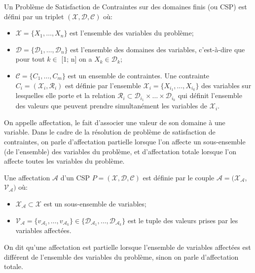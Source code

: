 \begin{definition} Un Problème de Satisfaction de Contraintes sur des domaines finis (ou CSP) est défini par un triplet $(\mathcal{X},\mathcal{D},\mathcal{C})$ où:
	\label{def:CSP}
	\begin{itemize}
		\item $\mathcal{X} = \{X_1, \dots, X_n \}$ est l'ensemble des variables du problème;
		\item $\mathcal{D} = \{\mathcal{D}_1, \dots, \mathcal{D}_n \}$ est l'ensemble des domaines des variables, c'est-à-dire que pour tout $k \in$ [1; n] on a $X_k \in \mathcal{D}_k$;
		\item $\mathcal{C} = \{C_1, \dots, C_m \}$ est un ensemble de contraintes. Une contrainte $C_i=(\mathcal{X}_i, \mathcal{R}_i)$ est définie par l'ensemble $\mathcal{X}_i = \{X_{i_1}, \dots, X_{i_k}\}$ des variables sur lesquelles elle porte et la relation $\mathcal{R}_i \subset \mathcal{D}_{i_1} \times \dots \times \mathcal{D}_{i_k}$ qui définit l'ensemble des valeurs que peuvent prendre simultanément les variables de $\mathcal{X}_i$.
	\end{itemize}
\end{definition}

On appelle affectation, le fait d'associer une valeur de son domaine à une variable. Dans le cadre de la résolution de problème de satisfaction de contraintes, on parle d'affectation partielle lorsque l'on affecte un sous-ensemble (de l'ensemble) des variables du problème, et d'affectation totale lorsque l'on affecte toutes les variables du problème.

\begin{definition} Une affectation $\mathcal{A}$ d'un CSP $P = (\mathcal{X},\mathcal{D},\mathcal{C})$ est définie par le couple $\mathcal{A} = (\mathcal{X_{\mathcal{A}}}$, $\mathcal{V_{\mathcal{A}}})$ où:
	\label{def:affectation-CSP}
	\begin{itemize}
		\item $\mathcal{X_{\mathcal{A}}} \subset \mathcal{X}$ est un sous-ensemble de variables;
		\item $\mathcal{V_{\mathcal{A}}} = \{ v_{\mathcal{A}_1}, \dots, v_{\mathcal{A}_k}\} \in \{ \mathcal{D}_{\mathcal{A}_1}, \dots, \mathcal{D}_{\mathcal{A}_k}\}$ est le tuple des valeurs prises par les variables affectées.
	\end{itemize}	
\end{definition}

On dit qu'une affectation est partielle lorsque l'ensemble de variables affectées est différent de l'ensemble des variables du problème, sinon on parle d'affectation totale.

